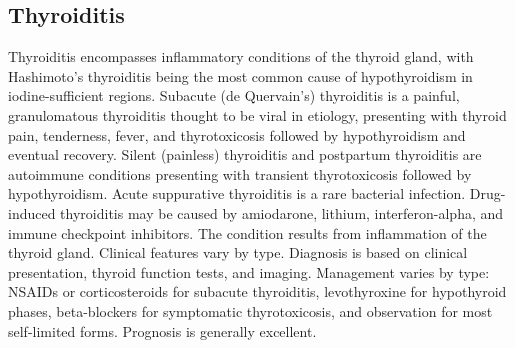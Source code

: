 \subsection{Thyroiditis}
\label{sec:Thyroiditis}
Thyroiditis encompasses inflammatory conditions of the thyroid gland, with Hashimoto's thyroiditis being the most common cause of hypothyroidism in iodine-sufficient regions. Subacute (de Quervain's) thyroiditis is a painful, granulomatous thyroiditis thought to be viral in etiology, presenting with thyroid pain, tenderness, fever, and thyrotoxicosis followed by hypothyroidism and eventual recovery. Silent (painless) thyroiditis and postpartum thyroiditis are autoimmune conditions presenting with transient thyrotoxicosis followed by hypothyroidism. Acute suppurative thyroiditis is a rare bacterial infection. Drug-induced thyroiditis may be caused by amiodarone, lithium, interferon-alpha, and immune checkpoint inhibitors. The condition results from inflammation of the thyroid gland. Clinical features vary by type. Diagnosis is based on clinical presentation, thyroid function tests, and imaging. Management varies by type: NSAIDs or corticosteroids for subacute thyroiditis, levothyroxine for hypothyroid phases, beta-blockers for symptomatic thyrotoxicosis, and observation for most self-limited forms. Prognosis is generally excellent.

